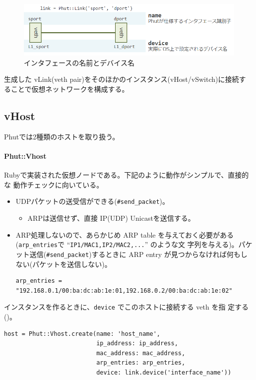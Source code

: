 \begin{figure}[h]
 \centering
 \includegraphics[scale=0.6]{img/phut-vlink-model2.png}
 \caption{インタフェースの名前とデバイス名}
 \label{fig:vlink-model2}
\end{figure}

生成した vLink(veth pair)をそのほかのインスタンス(vHost/vSwitch)に接続す
ることで仮想ネットワークを構成する。

\subsection{vHost}
Phutでは2種類のホストを取り扱う。

\paragraph{Phut::Vhost}

Rubyで実装された仮想ノードである。下記のように動作がシンプルで、直接的な
動作チェックに向いている。
\begin{itemize}
 \item UDPパケットの送受信ができる(\verb|#send_packet|)。
       \begin{itemize}
        \item ARPは送信せず、直接 IP(UDP) Unicastを送信する。
       \end{itemize}
 \item ARP処理しないので、あらかじめ ARP table を与えておく必要がある
       (\verb|arp_entries|で ``\verb|IP1/MAC1,IP2/MAC2,...|'' のような文
       字列を与える)。パケット送信(\verb|#send_packet|)するときに ARP
       entry が見つからなければ何もしない(パケットを送信しない)。
\begin{lstlisting}
arp_entries = "192.168.0.1/00:ba:dc:ab:1e:01,192.168.0.2/00:ba:dc:ab:1e:02"
\end{lstlisting}
\end{itemize}


インスタンスを作るときに、\verb|device| でこのホストに接続する veth を指
定する()。
\begin{lstlisting}[caption=Phut::Vhostインスタンスの作成,label=lst:create-vhost-instance]
host = Phut::Vhost.create(name: 'host_name',
                          ip_address: ip_address,
                          mac_address: mac_address,
                          arp_entries: arp_entries,
                          device: link.device('interface_name'))
\end{lstlisting}

